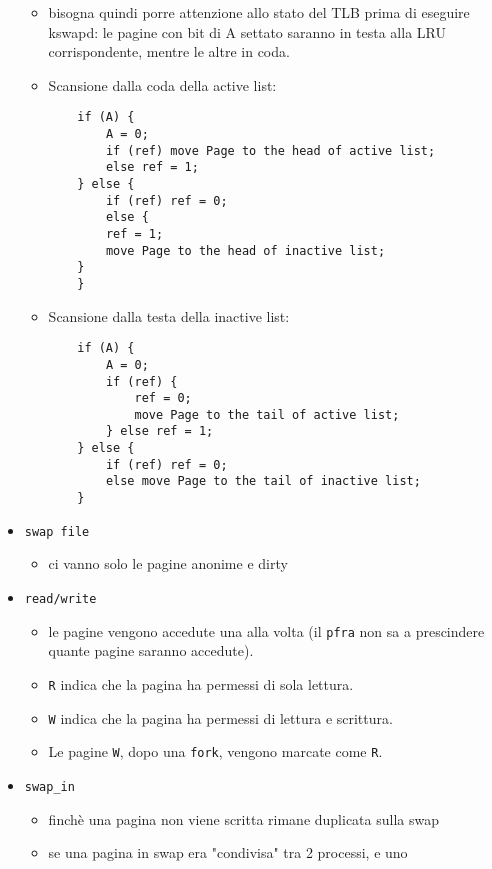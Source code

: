 \documentclass[12pt, a4paper]{report}
\begin{document}
\begin{itemize}
\begin{itemize}
		      \item bisogna quindi porre attenzione allo stato del TLB prima di
		            eseguire kswapd: le pagine con bit di A settato saranno in
		            testa alla LRU corrispondente, mentre le altre in coda.
		      \item Scansione dalla coda della active list:
		            \begin{verbatim}
    if (A) {
        A = 0;
        if (ref) move Page to the head of active list;
        else ref = 1;
    } else {
        if (ref) ref = 0;
        else {
	    ref = 1;
	    move Page to the head of inactive list;
	}
    }
				\end{verbatim}
		      \item Scansione dalla testa della inactive list:
		            \begin{verbatim}
    if (A) {
        A = 0;
        if (ref) {
            ref = 0;
            move Page to the tail of active list;
        } else ref = 1;
    } else {
        if (ref) ref = 0;
        else move Page to the tail of inactive list;
    }
				\end{verbatim}
	      \end{itemize}
	\item \texttt{swap file}
	      \begin{itemize}
		      \item ci vanno solo le pagine anonime e dirty
	      \end{itemize}
	\item \texttt{read/write}
	      \begin{itemize}
		      \item le pagine vengono accedute una alla volta (il \texttt{pfra}
		            non sa a prescindere quante pagine saranno accedute).
		      \item \texttt{R} indica che la pagina ha permessi di
		            sola lettura.
		      \item \texttt{W} indica che la pagina ha permessi di
		            lettura e scrittura.
		      \item  Le pagine \texttt{W}, dopo una \texttt{fork}, vengono marcate
		            come \texttt{R}.
	      \end{itemize}
	\item \texttt{swap\_in}
	      \begin{itemize}
		      \item finchè una pagina non viene scritta rimane duplicata sulla
		            swap
		      \item se una pagina in swap era "condivisa" tra 2 processi, e uno

\end{itemize}
\end{itemize}
\end{document}
